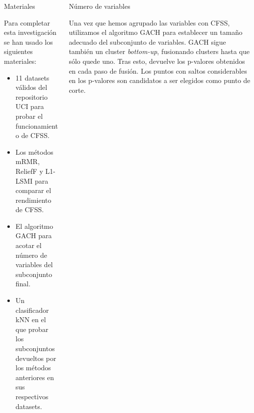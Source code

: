 \documentclass[final]{beamer}
\newlength{\onecolwid}
\newlength{\twocolwid}
\begin{document}
\begin{frame}[t]
\begin{columns}[t]
\begin{column}{\twocolwid} %

\begin{columns}[t,totalwidth=\twocolwid] %

\begin{column}{\onecolwid}\vspace{-.6in} %


\begin{block}{Materiales}

Para completar esta investigación se han usado los siguientes materiales:

\begin{itemize}
\item 11 datasets válidos del repositorio UCI para probar el funcionamiento de CFSS.
\item Los métodos mRMR, ReliefF y L1-LSMI para comparar el rendimiento de CFSS.
\item El algoritmo GACH para acotar el número de variables del subconjunto final.
\item Un clasificador kNN en el que probar los subconjuntos devueltos por los métodos anteriores en sus respectivos datasets.
\end{itemize}

\end{block}


\end{column} %

\begin{column}{\onecolwid}\vspace{-.6in} %


\begin{block}{Número de variables}

Una vez que hemos agrupado las variables con CFSS, utilizamos el algoritmo GACH para establecer un tamaño adecuado del subconjunto de variables. GACH sigue también un cluster \textit{bottom-up}, fusionando clusters hasta que sólo quede uno. Tras esto, devuelve los p-valores obtenidos en cada paso de fusión. Los puntos con saltos considerables en los p-valores son candidatos a ser elegidos como punto de corte.




\end{block}
\end{column}
\end{columns}
\end{column}
\end{columns}
\end{frame}
\end{document}
